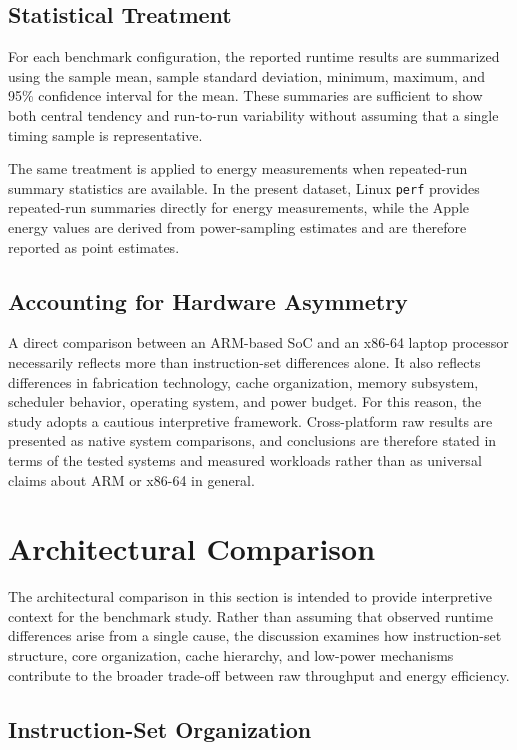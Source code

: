 \documentclass{tcsa}
\begin{document}
\subsection{Statistical Treatment}

For each benchmark configuration, the reported runtime results are summarized
using the sample mean, sample standard deviation, minimum, maximum, and 95\%
confidence interval for the mean. These summaries are sufficient to show both
central tendency and run-to-run variability without assuming that a single timing
sample is representative.

The same treatment is applied to energy measurements when repeated-run summary
statistics are available. In the present dataset, Linux \texttt{perf} provides
repeated-run summaries directly for energy measurements, while the Apple energy
values are derived from power-sampling estimates and are therefore reported as
point estimates.

\subsection{Accounting for Hardware Asymmetry}

A direct comparison between an ARM-based SoC and an x86-64 laptop processor 
necessarily reflects more than instruction-set differences alone. It also reflects 
differences in fabrication technology, cache organization, memory subsystem, 
scheduler behavior, operating system, and power budget. For this reason, the study 
adopts a cautious interpretive framework. Cross-platform raw results are presented 
as native system comparisons, and conclusions are therefore stated in terms of the 
tested systems and measured workloads rather than as universal claims about ARM or 
x86-64 in general.

\section{Architectural Comparison}

The architectural comparison in this section is intended to provide interpretive 
context for the benchmark study. Rather than assuming that observed runtime 
differences arise from a single cause, the discussion examines how instruction-set 
structure, core organization, cache hierarchy, and low-power mechanisms contribute 
to the broader trade-off between raw throughput and energy efficiency.

\subsection{Instruction-Set Organization}
\end{document}
